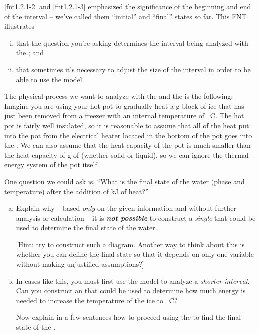 \label{fnt1.2.1-4}

\ref{fnt1.2.1-2} and \ref{fnt1.2.1-3} emphasized the significance of the beginning and end of the interval -- we've called them ``initial'' and ``final'' states so far. This FNT illustrates
\begin{enumerate}[(i)]

	\item that the question you're asking determines the interval being analyzed with the \EnergyInteractionModel{}; and

	\item that sometimes it's necessary to adjust the size of the interval in order to be able to use the model.

\end{enumerate}

\noindent The physical process we want to analyze with the \ThreePhaseModel{} and the \EnergyInteractionModel{} is the following:\\

\noindent Imagine you are using your hot pot to gradually heat a \unit[500]{g} block of ice that has just been removed from a freezer with an internal temperature of \unit[-25]{\textdegree C}. The hot pot is fairly well insulated, so it is reasonable to assume that all of the heat put into the pot from the electrical heater located in the bottom of the pot goes into the . We can also assume that the heat capacity of the pot is much smaller than the heat capacity of \unit[500]{g} of  (whether solid or liquid), so we can ignore the thermal energy system of the pot itself.

One question we could ask is, ``What is the final state of the water (phase and temperature) after the addition of \unit[252]{kJ} of heat?'' 

\begin{enumerate}[(a)]

	\item Explain why -- based {\em only} on the given information and without further analysis or calculation -- it is \textbf{\em not possible} to construct a {\em single} \EnergyDiagram{} that could be used to determine the final state of the water.
	
		[Hint: try to construct such a diagram. Another way to think about this is whether you can define the final state so that it depends on only one variable without making unjustified assumptions?]

	\item In cases like this, you must first use the model to analyze a {\em shorter interval}. Can you construct an \EnergyDiagram{} that could be used to determine how much energy is needed to increase the temperature of the ice to \unit[0]{\textdegree C}?
	
		Now explain in a few sentences how to proceed using the \EnergyInteractionModel{} to find the final state of the .

\end{enumerate}